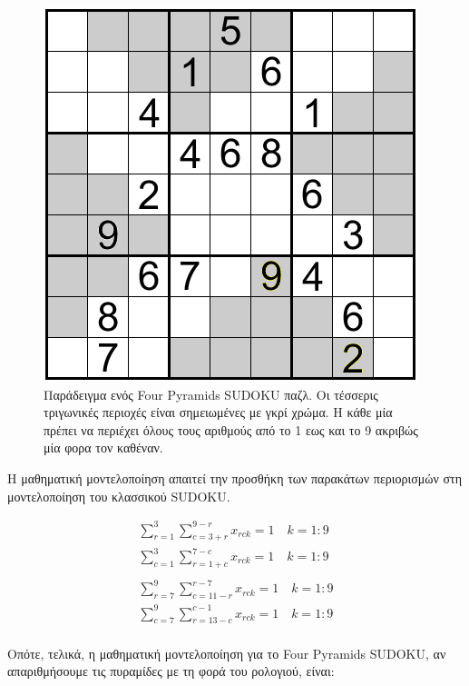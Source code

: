 \documentclass[12pt]{book}
\theoremstyle{definition}
\begin{document}
\begin{figure}[h]
	\centering	
	\includegraphics[scale=0.7]{Figures/Pyramid Sudoku.png}
	\caption{Παράδειγμα ενός Four Pyramids SUDOKU παζλ. Οι τέσσερις τριγωνικές περιοχές είναι σημειωμένες με γκρί χρώμα. Η κάθε μία πρέπει να περιέχει όλους τους αριθμούς από το 1 εως και το 9 ακριβώς μία φορα τον καθέναν.}
\end{figure}

Η μαθηματική μοντελοποίηση απαιτεί την προσθήκη των παρακάτων περιορισμών στη μοντελοποίηση του κλασσικού SUDOKU.

\begin{align*}
	\sum_{r=1}^{3}{\sum_{c=3+r}^{9-r} x_{rck}} = 1 \quad k=1:9 \\
	\sum_{c=1}^{3}{\sum_{r=1+c}^{7-c} x_{rck}} = 1 \quad k=1:9 \\\\
	\sum_{r=7}^{9}{\sum_{c=11-r}^{r-7} x_{rck}} = 1 \quad k=1:9 \\
	\sum_{c=7}^{9}{\sum_{r=13-c}^{c-1} x_{rck}} = 1 \quad k=1:9 \\	
\end{align*}

Οπότε, τελικά, η μαθηματική μοντελοποίηση για το Four Pyramids SUDOKU, αν απαριθμήσουμε τις πυραμίδες με τη φορά του ρολογιού, είναι:
\end{document}
